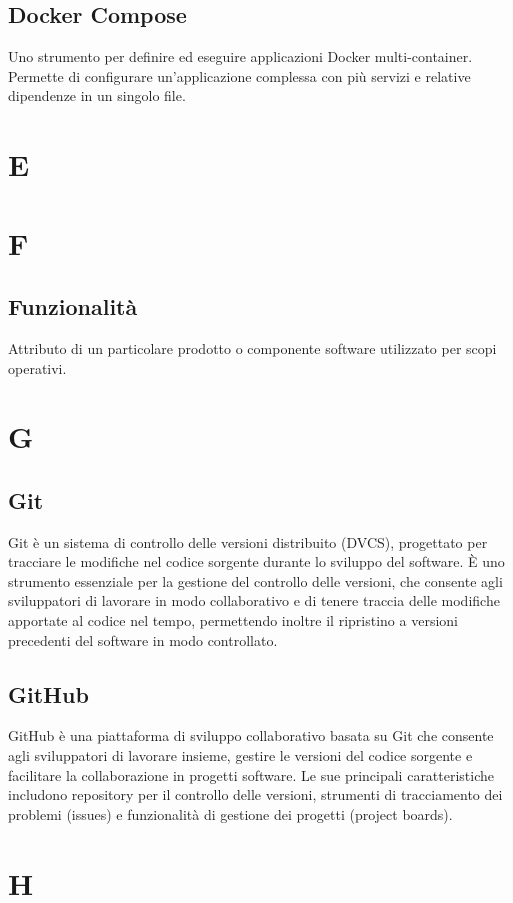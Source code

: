 \documentclass[8pt]{article}
\begin{document}
	\subsection*{Docker Compose}
	Uno strumento per definire ed eseguire applicazioni Docker multi-container. Permette di configurare un'applicazione complessa con più servizi e relative dipendenze in un singolo file.
	\newpage
	\section*{E}
	\section*{F}
	\subsection*{Funzionalit\`a}
	Attributo di un particolare prodotto o componente software utilizzato per scopi operativi.
	\newpage
	\section*{G}
	\subsection*{Git}
	Git è un sistema di controllo delle versioni distribuito (DVCS), progettato per tracciare le modifiche nel codice sorgente durante lo sviluppo del software. È uno strumento essenziale per la gestione del controllo delle versioni, che consente agli sviluppatori di lavorare in modo collaborativo e di tenere traccia delle modifiche apportate al codice nel tempo, permettendo inoltre il ripristino a versioni precedenti del software in modo controllato.
	\subsection*{GitHub}
	GitHub è una piattaforma di sviluppo collaborativo basata su Git che consente agli sviluppatori di lavorare insieme, gestire le versioni del codice sorgente e facilitare la collaborazione in progetti software. Le sue principali caratteristiche includono repository per il controllo delle versioni, strumenti di tracciamento dei problemi (issues) e funzionalità di gestione dei progetti (project boards).
	\newpage
	\section*{H}
	
\end{document}
